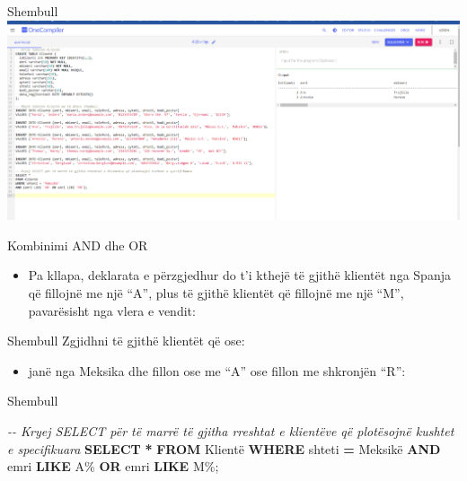 \documentclass[
  ignorenonframetext,
]{beamer}
\newenvironment{Shaded}{\begin{snugshade}}{\end{snugshade}}
\newcommand{\CommentTok}[1]{\textcolor[rgb]{0.56,0.35,0.01}{\textit{#1}}}
\newcommand{\KeywordTok}[1]{\textcolor[rgb]{0.13,0.29,0.53}{\textbf{#1}}}
\newcommand{\NormalTok}[1]{#1}
\newcommand{\OperatorTok}[1]{\textcolor[rgb]{0.81,0.36,0.00}{\textbf{#1}}}
\newcommand{\StringTok}[1]{\textcolor[rgb]{0.31,0.60,0.02}{#1}}
\providecommand{\tightlist}{%
  \setlength{\itemsep}{0pt}\setlength{\parskip}{0pt}}
\begin{document}
\begin{frame}{Shembull}
\label{shembull-28}
\includegraphics{./Figs/query16.png}
\end{frame}

\begin{frame}{Kombinimi AND dhe OR}
\label{kombinimi-and-dhe-or-1}
\begin{itemize}
\tightlist
\item
  Pa kllapa, deklarata e përzgjedhur do t'i kthejë të gjithë klientët
  nga Spanja që fillojnë me një ``A'', plus të gjithë klientët që
  fillojnë me një ``M'', pavarësisht nga vlera e vendit:
\end{itemize}
\end{frame}

\begin{frame}{Shembull}
\label{shembull-29}
Zgjidhni të gjithë klientët që ose:

\begin{itemize}
\tightlist
\item
  janë nga Meksika dhe fillon ose me ``A'' ose fillon me shkronjën
  ``R'':
\end{itemize}
\end{frame}

\begin{frame}[fragile]{Shembull}
\label{shembull-30}

\begin{Shaded}
\begin{Highlighting}[]
\CommentTok{{-}{-} Kryej SELECT për të marrë të gjitha rreshtat e klientëve që plotësojnë kushtet e specifikuara}
\KeywordTok{SELECT} \OperatorTok{*} 
\KeywordTok{FROM}\NormalTok{ Klientë}
\KeywordTok{WHERE}\NormalTok{ shteti }\OperatorTok{=} \StringTok{\textquotesingle{}Meksikë\textquotesingle{}}
\KeywordTok{AND}\NormalTok{ emri }\KeywordTok{LIKE} \StringTok{\textquotesingle{}A\%\textquotesingle{}} \KeywordTok{OR}\NormalTok{ emri }\KeywordTok{LIKE} \StringTok{\textquotesingle{}M\%\textquotesingle{}}\NormalTok{;}
\end{Highlighting}
\end{Shaded}
\end{frame}
\end{document}
